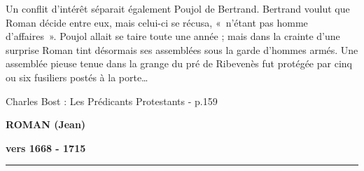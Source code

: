 \begin{tcolorbox}[
  colback=white,
  colframe=black,
  boxrule=0.7pt,
  arc=0pt,
  left=0.20cm,
  right=0.20cm,
  top=0.10cm,
  bottom=0.10cm,
  boxsep=0pt
]
Un conflit d’intérêt séparait également Poujol de Bertrand. Bertrand voulut que Roman décide entre eux, mais celui-ci se récusa, «~n’étant pas homme d’affaires~». Poujol allait se taire toute une année ; mais dans la crainte d’une surprise Roman tint désormais ses assemblées sous la garde d’hommes armés. Une assemblée pieuse tenue dans la grange du pré de Ribevenès fut protégée par cinq ou six fusiliers postés à la porte…

\begin{flushright}
Charles Bost : Les Prédicants Protestants - {\scriptsize p.159}
\end{flushright}

\end{tcolorbox}


\newpage


\begin{center}
  {\fontsize{12}{13}\selectfont\bfseries ROMAN (Jean)\par}
  {\fontsize{12}{13}\selectfont\bfseries vers 1668 - 1715\par}
  \vspace{0.10em}
  \rule{3.8cm}{0.45pt}
\end{center}

\vspace{0.45em}

